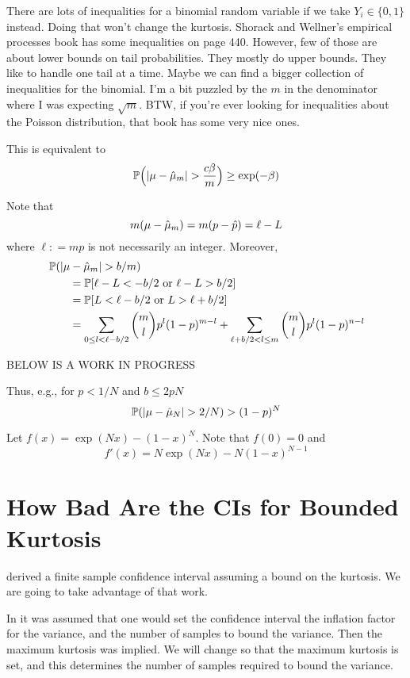 \documentclass{amsart}
\newcommand{\art}[1]{{\color{blue}#1}}
\begin{document}
\art{There are lots of inequalities for a binomial random variable if we take $Y_i\in\{0,1\}$ instead. Doing that won't change the kurtosis. Shorack and Wellner's empirical processes book has some inequalities on page 440. However, few of those are about lower bounds on tail probabilities. They mostly do upper bounds. They like to handle one tail at a time.  Maybe we can find a bigger collection of inequalities for the binomial.  I'm a bit puzzled by the $m$ in the denominator where I was expecting $\sqrt{m}$. BTW, if you're ever looking for inequalities about the Poisson distribution, that book has some very nice ones. }

This is equivalent to
\[
\operatorname{\mathbb{P}}\Bigl(\lvert \mu - \hat{\mu}_m \rvert > \frac{c \beta}{m} \Bigr) \ge \exp(-\beta)
\]

Note that 
\[
m(\mu - \hat{\mu}_m)  = m(p - \hat{p}) = \ell - L
\]
where $\ell : = mp$ is not necessarily an integer.
Moreover, 
\begin{align*}
    \MoveEqLeft \Prob(\lvert \mu - \hmu_m \rvert > b/m) \\
    &= \Prob[ \ell - L < -b/2 \text{ or } \ell - L >  b/2] \\
    &= \Prob[ L < \ell - b/2 \text{ or } L > \ell + b/2] \\
    & = \sum_{0 \le l  < \ell - b/2}  \binom{m}{l} p^{l}(1-p)^{m-l} 
    + \sum_{\ell + b/2 < l \le m}  \binom{m}{l} p^l(1-p)^{n-l}
\end{align*}

\bigskip

BELOW IS A WORK IN PROGRESS


Thus, e.g., for $p < 1/N$ and $b \le 2pN $
\[
\operatorname{\mathbb{P}}(\lvert \mu - \hat{\mu}_N \rvert > 2/N) 
> (1-p)^{N} 
\]

Let $f(x) = \exp(Nx) - (1-x)^N$.  Note that $f(0) =0$ and 
\[
f'(x) = N \exp(Nx) - N(1-x)^{N-1}
\]

\section{How Bad Are the CIs for Bounded Kurtosis}

\cite{HicEtal14a} derived a finite sample confidence interval assuming a bound on the kurtosis.  We are going to take advantage of that work.

In \cite{HicEtal14a} it was assumed that one would set the confidence interval the inflation factor for the variance, and the number of samples to bound the variance.  Then the maximum kurtosis was implied.  We will change so that the maximum kurtosis is set, and this determines the number of samples required to bound the variance.






\end{document}
